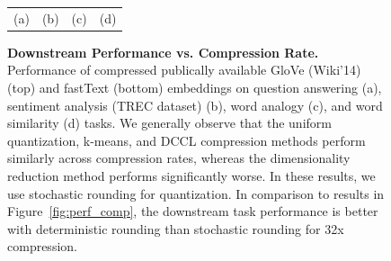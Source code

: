 \begin{figure}
\begin{tabular}{@{\hskip -0.0in}c@{\hskip -0.0in}c@{\hskip -0.0in}c@{\hskip -0.0in}c@{\hskip -0.0in}}
		\;\;\;\;\;(a) & \;\;\;\;\;\;(b) & \;\;\;\;\;\;(c) & \;\;\;\;\;\;(d)
	\end{tabular}
	\caption{
		\textbf{Downstream Performance vs. Compression Rate.}
		Performance of compressed publically available GloVe (Wiki'14) (top) and fastText (bottom) embeddings on question answering (a), sentiment analysis (TREC dataset) (b), word analogy (c), and word similarity (d) tasks.
		We generally observe that the uniform quantization, k-means, and DCCL compression methods perform similarly across compression rates, whereas the dimensionality reduction method performs significantly worse. In these results, we use stochastic rounding for quantization. In comparison to results in Figure~\ref{fig:perf_comp}, the downstream task performance is better with deterministic rounding than stochastic rounding for 32x compression. 
	}
	\label{fig:perf_comp_stoc}
\end{figure}



